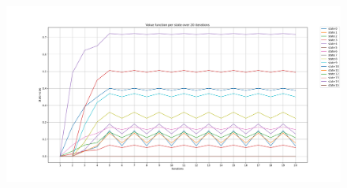 \documentclass{assignmeownt}
\begin{document}
\begin{figure}[H]
    \centering
    \includegraphics[width=1.0\textwidth]{q2_2_state_value_per_iter_plot.png}
\end{figure}
\end{document}

